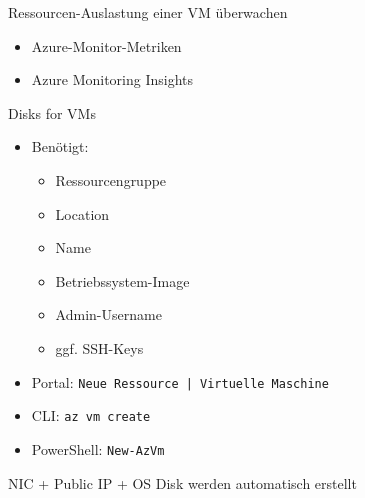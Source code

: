 
\begin{flashcard}[Definition]{Ressourcen-Auslastung einer VM überwachen}
    \begin{itemize}
        \item Azure-Monitor-Metriken
        \item Azure Monitoring Insights
    \end{itemize}
\end{flashcard}



\begin{flashcard}[Definition]{Disks for VMs}
    \begin{itemize}
        \item Benötigt:
            \begin{itemize}
                \item Ressourcengruppe
                \item Location
                \item Name
                \item Betriebssystem-Image
                \item Admin-Username
                \item ggf. SSH-Keys
            \end{itemize}
        \item Portal: \texttt{Neue Ressource | Virtuelle Maschine}
        \item CLI: \texttt{az vm create}
        \item PowerShell: \texttt{New-AzVm}
    \end{itemize}
    NIC + Public IP + OS Disk werden automatisch erstellt
\end{flashcard}


